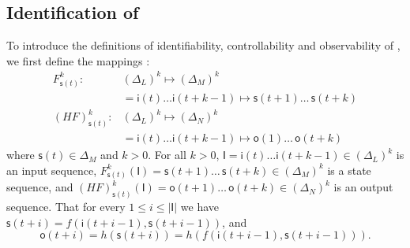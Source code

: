 %  


\subsection{Identification of \BCNs}
To introduce the definitions of identifiability, controllability and observability of \BCNs, we first define the mappings \cite{Zhang2016Observability}:
\begin{equation}
\begin{split}
F^k_{\mathsf{s}(t)}:& (\Delta_L)^k\mapsto(\Delta_M)^k\\
&=\mathsf{i}(t)\ldots \mathsf{i}({t+k-1}) \mapsto \mathsf{s}(t+1) \ldots\, \mathsf{s}(t+k)\\
(HF)^k_{\mathsf{s}(t)} :& (\Delta_L)^k\mapsto(\Delta_N)^k\\
 &=\mathsf{i}(t)\ldots \mathsf{i}(t+k-1) \mapsto \mathsf{o}(1)\ldots\, \mathsf{o}(t+k)
\end{split}
\label{equ:6}
\end{equation}
where $\mathsf{s}(t)\in \Delta_M$ and $k>0$. For all  $k>0$,
$\mathsf{I}=\mathsf{i}(t)\ldots \mathsf{i}({t+k-1}) \in(\Delta_L)^k$
is an input sequence, 
$F^k_{\mathsf{s}(t)}(\mathsf{I})=\mathsf{s}(t+1) \ldots\, \mathsf{s}(t+k) \in(\Delta_M)^k$
 is a state sequence, and 
 $(HF)^k_{\mathsf{s}(t)}(\mathsf{I})=\mathsf{o}(t+1)\ldots\, \mathsf{o}(t+k) \in(\Delta_N)^k$
 is an output sequence. That for every $1\le i \le |\mathsf{I}|$ we have 
 $\mathsf{s}(t+i)=f(\mathsf{i}(t+i-1),\mathsf{s}(t+i-1))$,
and 
 \[\mathsf{o}(t+i)=h(\mathsf{s}(t+i))=h(f(\mathsf{i}(t+i-1),\mathsf{s}(t+i-1))).\] 

